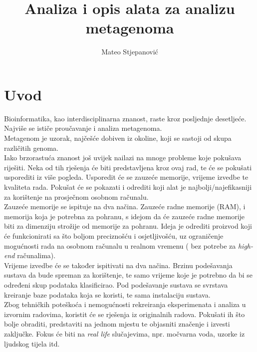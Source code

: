 \documentclass[times, utf8, seminar]{fer}
\begin{document}
\title{Analiza i opis alata za analizu metagenoma}

\author{Mateo Stjepanović}


\maketitle

\tableofcontents

\chapter{Uvod} \label{uvod}
Bioinformatika, kao interdisciplinarna znanost, raste kroz posljednje desetljeće. Najviše se ističe proučavanje i analiza metagenoma.
\\Metagenom je uzorak, najčešće dobiven iz okoline, koji se sastoji od skupa različitih genoma. 
\\Iako brzorastuća znanost još uvijek nailazi na mnoge probleme koje pokušava riješiti. Neka od tih rješenja će biti predstavljena kroz ovaj rad, te će se pokušati usporediti iz više pogleda. Usporedit će se zauzeće memorije, vrijeme izvedbe te kvaliteta rada. Pokušat će se pokazati i odrediti koji alat je najbolji/najefikasniji za korištenje na prosječnom osobnom računalu.
\\Zauzeće memorije se ispituje na dva načina. Zauzeće radne memorije (RAM), i memorija koja je potrebna za pohranu, s idejom da će zauzeće radne memorije biti za dimenziju strožije od memorije za pohranu. Ideja je odrediti proizvod koji će funkcionirati sa što boljom preciznošću i osjetljivošću, uz ograničenje mogućnosti rada na osobnom računalu u realnom vremenu ( bez potrebe za \textit{high-end} računalima).
\\Vrijeme izvedbe će se također ispitivati na dva načina. Brzinu podešavanja sustava da bude spreman za korištenje, te samo vrijeme koje je potrebno da bi se određeni skup podataka klasificirao. Pod podešavanje sustava se svrstava kreiranje baze podataka koja se koristi, te sama instalaciju sustava.
\\Zbog tehničkih poteškoća i nemogućnosti rekreiranja eksperimenata i analiza u izvornim radovima, koristit će se rješenja iz originalnih radova. Pokušati ih što bolje obraditi, predstaviti na jednom mjestu te objasniti značenje i izvesti zaključke. Fokus će biti na \textit{real life} slučajevima, npr. močvarna voda, uzorke iz ljudskog tijela itd.
\end{document}
